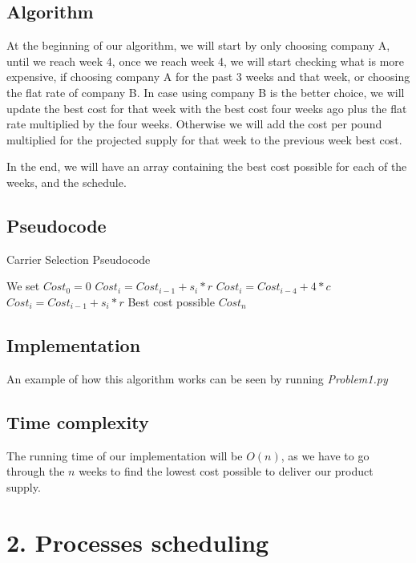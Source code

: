 \documentclass{article}
\begin{document}
\subsection*{Algorithm}

At the beginning of our algorithm, we will start by only choosing company A, until we reach week 4, once we reach week 4, we will start checking  what is more expensive, if choosing company A for the past 3 weeks and that week, or choosing the flat rate of company B. In case using company B is the better choice, we will update the best cost for that week with the best cost four weeks ago plus the flat rate multiplied by the four weeks. Otherwise we will add the cost per pound multiplied for the projected supply for that week to the previous week best cost.

In the end, we will have an array containing the best cost possible for each of the weeks, and the schedule.

\subsection*{Pseudocode}

\begin{algorithm}[H]
\caption{Carrier Selection Pseudocode}
\begin{algorithmic}[1]
\State We set $Cost_0 = 0$
  \State $Cost_i = Cost_{i-1}+s_i*r$
 \Else
   \State $Cost_i = Cost_{i-4}+4*c$
  \Else
   \State $Cost_i = Cost_{i-1}+s_i*r$
  \EndIf
 \EndIf
\EndFor
\State \Return Best cost possible $Cost_n$
\end{algorithmic}
\end{algorithm}

\subsection*{Implementation}

An example of how this algorithm works can be seen by running \textit{Problem1.py}

\subsection*{Time complexity}

The running time of our implementation will be $O(n)$, as we have to go through the $n$ weeks to find the lowest cost possible to deliver our product supply.

\section*{2. Processes scheduling}
\end{document}
